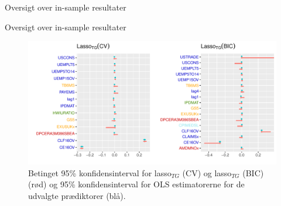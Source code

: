 \begin{frame}{Oversigt over in-sample resultater}
\end{frame}

\begin{frame}{Oversigt over in-sample resultater}
\begin{figure}
\includegraphics[width=1\linewidth, height=0.7\textheight]{slides/cf_interval.pdf}
\caption{Betinget 95\% konfidensinterval for lasso\(_{TG}\) (CV) og lasso\(_{TG}\) (BIC) (rød) og 95\% konfidensinterval for OLS estimatorerne for de udvalgte prædiktorer (blå).}
\end{figure}
\end{frame}


